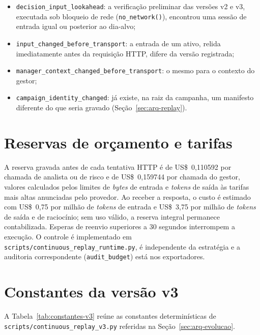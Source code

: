\begin{itemize}
  \item \texttt{decision\_input\_lookahead}: a verificação preliminar das versões v2 e v3, executada sob bloqueio de rede (\texttt{no\_network()}), encontrou uma sessão de entrada igual ou posterior ao dia-alvo;
  \item \texttt{input\_changed\_before\_transport}: a entrada de um ativo, relida imediatamente antes da requisição HTTP, difere da versão registrada;
  \item \texttt{manager\_context\_changed\_before\_transport}: o mesmo para o contexto do gestor;
  \item \texttt{campaign\_identity\_changed}: já existe, na raiz da campanha, um manifesto diferente do que seria gravado (Seção~\ref{sec:arq-replay}).
\end{itemize}

\section{Reservas de orçamento e tarifas}

A reserva gravada antes de cada tentativa HTTP é de US\$~0,110592 por chamada de analista ou de risco e de US\$~0,159744 por chamada do gestor, valores calculados pelos limites de \textit{bytes} de entrada e \textit{tokens} de saída às tarifas mais altas anunciadas pelo provedor. Ao receber a resposta, o custo é estimado com US\$~0,75 por milhão de \textit{tokens} de entrada e US\$~3,75 por milhão de \textit{tokens} de saída e de raciocínio; sem uso válido, a reserva integral permanece contabilizada. Esperas de reenvio superiores a 30 segundos interrompem a execução. O controle é implementado em \texttt{scripts/continuous\_replay\_runtime.py}, é independente da estratégia e a auditoria correspondente (\texttt{audit\_budget}) está nos exportadores.

\section{Constantes da versão v3}

A Tabela~\ref{tab:constantes-v3} reúne as constantes determinísticas de \texttt{scripts/continuous\_replay\_v3.py} referidas na Seção~\ref{sec:arq-evolucao}.

